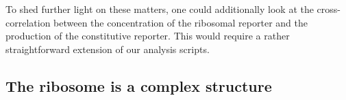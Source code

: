 To shed further light on these matters, one could additionally look at the cross-correlation between
the concentration of the ribosomal reporter and the production of the constitutive reporter.
%
This would require a rather straightforward extension of our analysis scripts.


\subsection{The ribosome is a complex structure}


